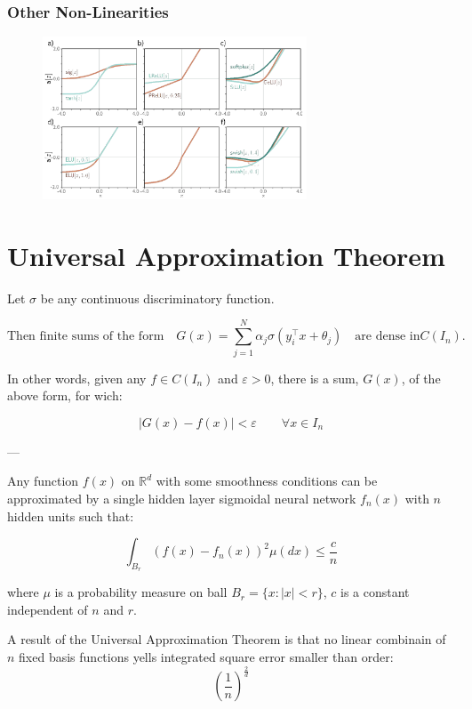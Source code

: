 \subsubsection{Other Non-Linearities}

\begin{figure}[H]
    \centering
    \includegraphics[width=0.7\textwidth]{assets/non-lin.png}
\end{figure}


\section{Universal Approximation Theorem}

Let $\sigma$ be any continuous discriminatory function.

$$
\displaystyle
\text{Then finite sums of the form}
\quad
G(x) = \sum_{j=1}^{N} \alpha_j \sigma(y_i^\top x + \theta_j)
\quad
\text{are dense in} C(I_n).
$$ 

In other words, given any $f \in C(I_n)$ and $\varepsilon > 0$, there is a sum, $G(x)$, of the above form, for wich:

$$
|G(x) - f(x)| < \varepsilon \quad \quad \forall x \in I_n
$$

---

Any function $f(x)$ on $\mathbb{R}^d$ with some smoothness conditions can be approximated by a single hidden layer sigmoidal neural network $f_n(x)$ with $n$ hidden units such that:

$$
\int_{B_r} \left(f(x)-f_n(x)\right)^2 \mu(dx) \le \dfrac cn
$$

where $\mu$ is a probability measure on ball $B_r = \{x:|x| < r\}$, $c$ is a constant independent of $n$ and $r$.

\begin{observationblock}

A result of the Universal Approximation Theorem is that no linear combinain of $n$ fixed basis functions yells integrated square error smaller than order:
$$
\left( \dfrac 1n \right) ^ \frac 2d
$$

\end{observationblock}

